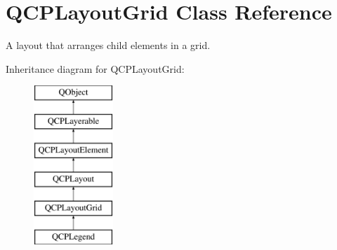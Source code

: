 \hypertarget{classQCPLayoutGrid}{}\section{Q\+C\+P\+Layout\+Grid Class Reference}
\label{classQCPLayoutGrid}


A layout that arranges child elements in a grid.  


Inheritance diagram for Q\+C\+P\+Layout\+Grid\+:\begin{figure}[H]
\begin{center}
\leavevmode
\includegraphics[height=6.000000cm]{classQCPLayoutGrid}
\end{center}
\end{figure}
